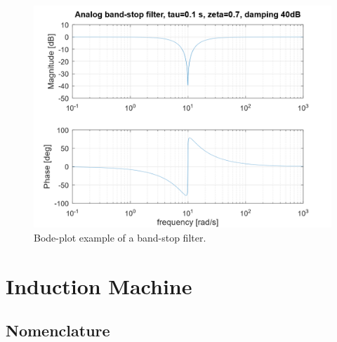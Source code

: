 \documentclass[]{book}
\begin{document}
\begin{figure}
\includegraphics[width=0.8\linewidth]{images/filters/bsf} \caption{Bode-plot example of a band-stop filter.}\label{fig:unnamed-chunk-7}
\end{figure}

\hypertarget{induction-machine}{%
\chapter{Induction Machine}\label{induction-machine}}

\hypertarget{nomenclature-1}{%
\section{Nomenclature}\label{nomenclature-1}}
\end{document}
